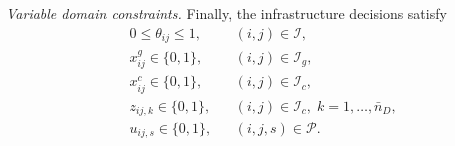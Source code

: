 \documentclass[pdflatex,sn-mathphys-num]{sn-jnl}%
\theoremstyle{thmstyleone}%
\theoremstyle{thmstyletwo}%
\theoremstyle{thmstylethree}%
\begin{document}
\noindent \textit{Variable domain constraints.} Finally, the infrastructure decisions satisfy
\begin{align}
& 0\le \theta_{ij}\le 1,
&&  (i,j)\in\mathcal I,
\label{eq:infra_theta}\\
& x^g_{ij}\in\{0,1\},
&&  (i,j)\in\mathcal I_g,
\label{eq:infra_binary_g}\\
& x^c_{ij}\in\{0,1\},
&&  (i,j)\in\mathcal I_c,
\label{eq:infra_binary_c}\\
& z_{ij,k}\in\{0,1\},
&&  (i,j)\in\mathcal I_c,\; k=1,\dots,\bar n_D,
\label{eq:infra_binary_z}\\
& u_{ij,s}\in\{0,1\},
&&  (i,j,s)\in\mathcal P.
\label{eq:infra_binary_u}
\end{align}



\end{document}
